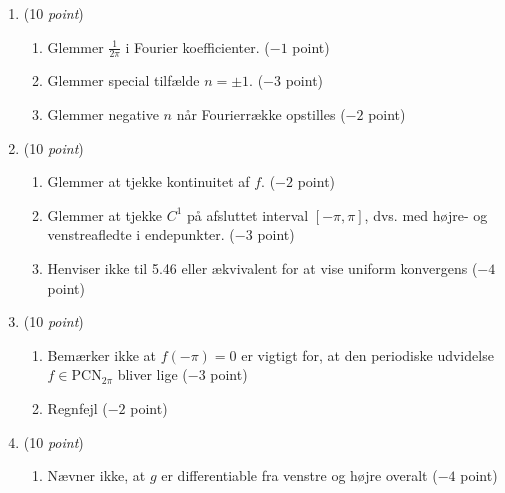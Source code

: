 \documentclass{article}
\begin{document}
\begin{opg}\hfill
	\begin{enumerate}
		\item (10 \emph{point})\begin{enumerate}[label=(\roman*)]
			\item Glemmer $ \frac{1}{2\pi} $ i Fourier koefficienter. ($ -1 $ point)
			\item Glemmer special tilfælde $ n=\pm 1 $. ($ -3 $ point)
			\item Glemmer negative $ n $ når Fourierrække opstilles ($ -2 $ point)
		\end{enumerate}
		\item (10 \emph{point}) \begin{enumerate}[label=(\roman*)]
			\item Glemmer at tjekke kontinuitet af $ f $. ($ -2 $ point)
			\item Glemmer at tjekke $ C^1 $ på afsluttet interval $ [-\pi,\pi] $, dvs. med højre- og venstreafledte i endepunkter. ($ -3 $ point)
			\item Henviser ikke til 5.46 eller ækvivalent for at vise uniform konvergens ($ -4 $ point)
		\end{enumerate}
		\item (10 \emph{point})\begin{enumerate}[label=(\roman*)]
			\item Bemærker ikke at $ f(-\pi)=0 $ er vigtigt for, at den periodiske udvidelse $ f\in\text{PCN}_{2\pi} $ bliver lige ($ -3 $ point)
			\item Regnfejl ($ -2 $ point)
		\end{enumerate}
		\item (10 \emph{point})\begin{enumerate}[label=(\roman*)]
			\item Nævner ikke, at $ g $ er differentiable fra venstre og højre overalt ($ -4 $ point) 
		\end{enumerate}
	\end{enumerate}	
\end{opg}
\end{document}
